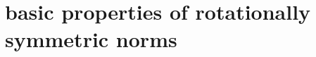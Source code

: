 \documentclass{article}[1100]
\theoremstyle{definition}
\theoremstyle{remark}
\newcommand\Ren[1]{\mathbb{R}^{#1}}
\newcommand\norma[1]{|\!|#1|\!|}
\newcommand\mySpaceH[1]{\textsc{H}(#1)}
\newcommand\mySpace[2]{\textsc{H}_{#1}(#2)}
\begin{document}

\section{basic properties of rotationally symmetric norms}
\end{document}
